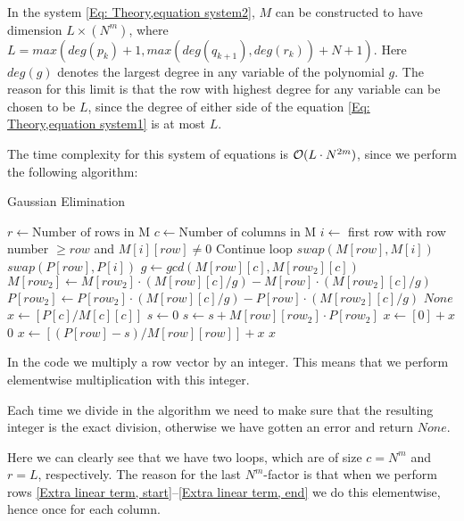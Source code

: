 In the system \eqref{Eq: Theory,equation system2}, $M$ can be constructed to have dimension $L\times (N^m)$, where $L=max(deg(p_k)+1,max(deg(q_{k+1}),deg(r_k))+N+1)$. Here $deg(g)$ denotes the largest degree in any variable of the polynomial $g$. The reason for this limit is that the row with highest degree for any variable can be chosen to be $L$, since the degree of either side of the equation \eqref{Eq: Theory,equation system1} is at most $L$.

The time complexity for this system of equations is $\mathcal{O}(L\cdot N^{2m})$, since we perform the following algorithm:
\begin{algorithm}[H]
  \caption{Gaussian Elimination}
  \begin{algorithmic}[1]
      \State $r\gets \text{Number of rows in M}$
      \State $c\gets \text{Number of columns in M}$
        \State $i\gets $ first row with row number $\geq row $ and $M[i][row]\neq 0$
          \State Continue loop
        \EndIf
        \State $swap(M[row],M[i])$ \label{Extra linear term, start}
        \State $swap(P[row],P[i])$
          \State $g\gets gcd(M[row][c],M[row_2][c])$
          \State $M[row_2] \gets M[row_2]\cdot (M[row][c]/g) - M[row]\cdot (M[row_2][c]/g)$
          \State $P[row_2] \gets P[row_2]\cdot (M[row][c]/g) - P[row]\cdot (M[row_2][c]/g)$ \label{Extra linear term, end}
        \EndFor
      \EndFor
          \State \Return $None$
        \EndIf
      \EndFor
      \State $x\gets [P[c]/M[c][c]]$
        \State $s\gets 0$
          \State $s\gets s + M[row][row_2]\cdot P[row_2]$
        \EndFor
            \State $x\gets [0] + x$
          \Else
            \State \Return $0$
          \EndIf
        \Else
          \State $x\gets [(P[row]-s)/M[row][row]] + x$
        \EndIf
      \EndFor
      \State \Return $x$
    \EndProcedure
  \end{algorithmic}
\end{algorithm}
\begin{remark}
  In the code we multiply a row vector by an integer. This means that we perform elementwise multiplication with this integer.
\end{remark}
\begin{remark}
  Each time we divide in the algorithm we need to make sure that the resulting integer is the exact division, otherwise we have gotten an error and return $None$.
\end{remark}
Here we can clearly see that we have two loops, which are of size $c=N^m$ and $r=L$, respectively. The reason for the last $N^m$-factor is that when we perform rows \ref{Extra linear term, start}--\ref{Extra linear term, end} we do this elementwise, hence once for each column.

